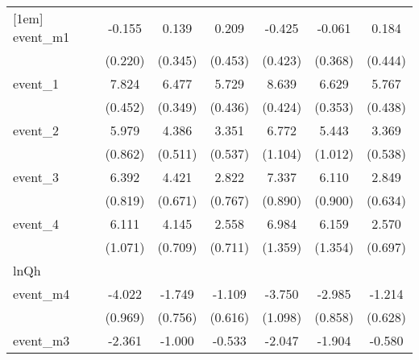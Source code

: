 {\begin{tabular}{l*{6}{c}}
[1em]
event\_m1    &      -0.155         &       0.139         &       0.209         &      -0.425         &      -0.061         &       0.184         \\
            &     (0.220)         &     (0.345)         &     (0.453)         &     (0.423)         &     (0.368)         &     (0.444)         \\
[1em]
event\_1     &       7.824\sym{***}&       6.477\sym{***}&       5.729\sym{***}&       8.639\sym{***}&       6.629\sym{***}&       5.767\sym{***}\\
            &     (0.452)         &     (0.349)         &     (0.436)         &     (0.424)         &     (0.353)         &     (0.438)         \\
[1em]
event\_2     &       5.979\sym{***}&       4.386\sym{***}&       3.351\sym{***}&       6.772\sym{***}&       5.443\sym{***}&       3.369\sym{***}\\
            &     (0.862)         &     (0.511)         &     (0.537)         &     (1.104)         &     (1.012)         &     (0.538)         \\
[1em]
event\_3     &       6.392\sym{***}&       4.421\sym{***}&       2.822\sym{***}&       7.337\sym{***}&       6.110\sym{***}&       2.849\sym{***}\\
            &     (0.819)         &     (0.671)         &     (0.767)         &     (0.890)         &     (0.900)         &     (0.634)         \\
[1em]
event\_4     &       6.111\sym{***}&       4.145\sym{***}&       2.558\sym{***}&       6.984\sym{***}&       6.159\sym{***}&       2.570\sym{***}\\
            &     (1.071)         &     (0.709)         &     (0.711)         &     (1.359)         &     (1.354)         &     (0.697)         \\
\hline
lnQh        &                     &                     &                     &                     &                     &                     \\
event\_m4    &      -4.022\sym{***}&      -1.749\sym{*}  &      -1.109         &      -3.750\sym{***}&      -2.985\sym{***}&      -1.214         \\
            &     (0.969)         &     (0.756)         &     (0.616)         &     (1.098)         &     (0.858)         &     (0.628)         \\
[1em]
event\_m3    &      -2.361\sym{**} &      -1.000         &      -0.533         &      -2.047\sym{*}  &      -1.904\sym{***}&      -0.580         \\

\end{tabular}}
